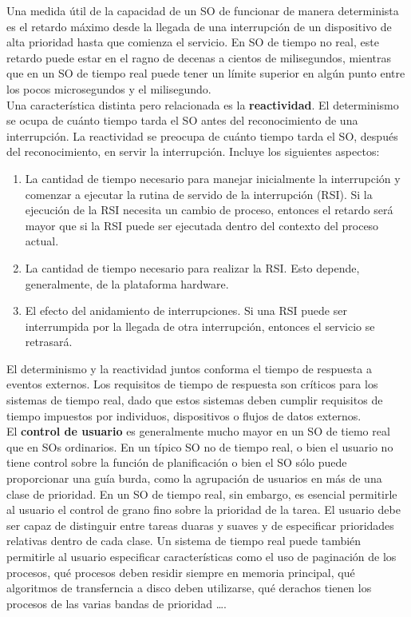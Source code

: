 \documentclass{article}
\begin{document}
				Una medida útil de la capacidad de un SO de funcionar de manera determinista es el retardo máximo desde la llegada de una interrupción de un dispositivo de alta prioridad hasta que comienza el servicio. En SO de tiempo no real, este retardo puede estar en el ragno de decenas a cientos de milisegundos, mientras que en un SO de tiempo real  puede tener un límite superior en algún punto entre los pocos microsegundos y el milisegundo. \\
				
				Una característica distinta pero relacionada es la \textbf{reactividad}. El determinismo se ocupa de cuánto tiempo tarda el SO antes del reconocimiento de una interrupción. La reactividad se preocupa de cuánto tiempo tarda el SO, después del reconocimiento, en servir la interrupción. Incluye los siguientes aspectos:
				
				\begin{enumerate}
				\item La cantidad de tiempo necesario para manejar inicialmente la interrupción y comenzar a ejecutar la rutina de servido de la interrupción (RSI). Si la ejecución de la RSI necesita un cambio de proceso, entonces el retardo será mayor que si la RSI  puede ser ejecutada dentro del contexto del proceso actual.
				\item La cantidad de tiempo necesario para realizar la RSI. Esto depende, generalmente, de la plataforma hardware.
				\item El efecto del anidamiento de interrupciones. Si una RSI  puede ser interrumpida por la llegada de otra interrupción, entonces el servicio se retrasará.
				\end{enumerate}
				
				El determinismo y la reactividad juntos conforma el tiempo de respuesta a eventos externos. Los requisitos de tiempo de respuesta son críticos para los sistemas de tiempo real, dado que estos sistemas deben cumplir requisitos de tiempo impuestos por individuos, dispositivos o flujos de datos externos. \\
				
				El \textbf{control de usuario} es generalmente mucho mayor en un SO de tiemo real que en SOs ordinarios. En un típico SO no de tiempo real, o bien el usuario no tiene control sobre la función de planificación o bien el SO sólo puede proporcionar una guía burda, como la agrupación de usuarios en más de una clase de prioridad. En un SO de tiempo real, sin embargo, es esencial permitirle al usuario el control de grano fino sobre la prioridad de la tarea. El usuario debe ser capaz de distinguir entre tareas duaras y suaves y de especificar prioridades relativas dentro de cada clase. Un sistema de tiempo real puede también permitirle al usuario especificar características como el uso de paginación de los procesos, qué procesos deben residir siempre en memoria principal, qué algoritmos de transferncia a disco deben utilizarse, qué derachos tienen los procesos de las varias bandas de prioridad \ldots. \\
				
\end{document}
